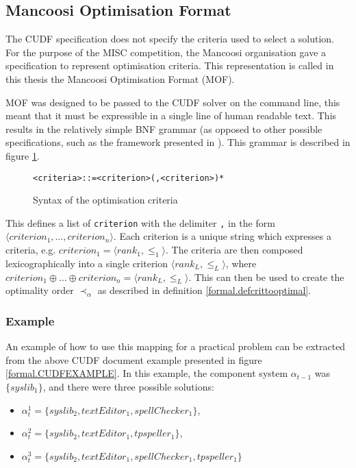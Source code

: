 \subsection{Mancoosi Optimisation Format}
\label{formal.mancoosioptimisationformat}
The CUDF specification does not specify the criteria used to select a solution.
For the purpose of the MISC competition, the Mancoosi organisation gave a specification to represent optimisation criteria.
This representation is called in this thesis the Mancoosi Optimisation Format (MOF).

MOF was designed to be passed to the CUDF solver on the command line, this meant that it must be expressible in a single line of human readable text.
This results in the relatively simple BNF grammar (as opposed to other possible specifications, such as the framework presented in \citep{Treinen2009}). 
This grammar is described in figure \ref{formal.optbnf}.
\begin{figure}[h!]
\begin{center}
\begin{alltt}
<criteria> ::= <criterion> (, <criterion>)*
\end{alltt}
  \caption{Syntax of the optimisation criteria}
  \label{formal.optbnf}
\end{center}
\end{figure}
This defines a list of \verb+criterion+ with the delimiter \verb+,+ in the form $\langle criterion_1, \ldots, criterion_n \rangle$.
Each criterion is a unique string which expresses a criteria, e.g. $criterion_1 = \langle rank_1, \leq_1 \rangle$.
The criteria are then composed lexicographically into a single criterion $\langle rank_L, \leq_L \rangle$, 
where $criterion_1 \oplus \ldots \oplus criterion_n = \langle rank_L, \leq_L \rangle$. 
This can then be used to create the optimality order $\prec_{\alpha}$ as described in definition \ref{formal.defcrittooptimal}.

\subsubsection{Example}
An example of how to use this mapping for a practical problem can be extracted from the above CUDF document example presented in figure \ref{formal.CUDFEXAMPLE}.
In this example, the component system $\alpha_{t-1}$ was  $\{syslib_1\}$, and there were three possible solutions:
\begin{itemize}
  \item $\alpha_t^1 = \{syslib_2, textEditor_1, spellChecker_1\}$,
  \item $\alpha_t^2 = \{syslib_2, textEditor_1, tpspeller_1\}$,
  \item $\alpha_t^3 = \{syslib_2, textEditor_1, spellChecker_1, tpspeller_1\}$
\end{itemize}

